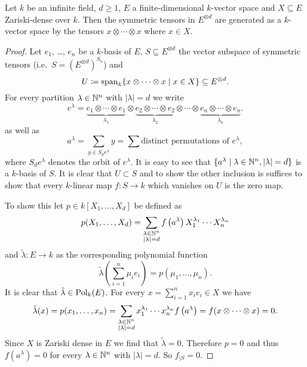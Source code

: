 \begin{lem}\label{lem: symmetric tensors and zariski dense subsets}
  Let $k$ be an infinite field, $d \geq 1$, $E$ a finite-dimensional $k$-vector space and $X \subseteq E$ Zariski-dense over $k$. Then the symmetric tensors in $E^{\otimes d}$ are generated as a $k$-vector space by the tensors $x \otimes \dotsb \otimes x$ where $x \in X$.
\end{lem}
\begin{proof}
  Let $e_1$, \dots, $e_n$ be a $k$-basis of $E$, $S \subseteq E^{\otimes d}$ the vector subspace of symmetric tensors (i.e.\ $S = (E^{\otimes d})^{S_n}$) and
  \[
    U \coloneqq \operatorname{span}_k \{x \otimes \dotsb \otimes x \mid x \in X\} \subseteq E^{\otimes d}.
  \]
  For every partition $\lambda \in \mathbb{N}^n$ with $|\lambda| = d$ we write
  \[
    e^\lambda = \underbrace{e_1 \otimes \dotsb \otimes e_1}_{\lambda_1} \otimes \underbrace{e_2 \otimes \dotsb \otimes e_2}_{\lambda_2} \otimes \dotsb \otimes \underbrace{e_n \otimes \dotsb \otimes e_n}_{\lambda_n}.
  \]
  as well as
  \[
    a^\lambda = \sum_{y \in S_d e^\lambda} y = \sum \text{distinct permutations of $e^\lambda$},
  \]
  where $S_d e^\lambda$ denotes the orbit of $e^\lambda$. It is easy to see that $\{a^\lambda \mid \lambda \in \mathbb{N}^n, |\lambda|=d\}$ is a $k$-basis of $S$. It is clear that $U \subset S$ and to show the other inclusion is suffices to show that every $k$-linear map $f \colon S \to k$ which vanishes on $U$ is the zero map.
  
  To show this let $p \in k[X_1, \dotsc, X_d]$ be defined as
  \[
    p(X_1, \dotsc, X_d) = \sum_{\substack{\lambda \in \mathbb{N}^n \\ |\lambda| = d}} f\left( a^\lambda \right) X_1^{\lambda_1} \dotsm X_n^{\lambda_n}
  \]
  and $\tilde{\lambda} \colon E \to k$ as the corresponding polynomial function
  \[
    \tilde{\lambda}\left( \sum_{i=1}^n \mu_i e_i \right) = p(\mu_1, \dotsc, \mu_n).
  \]
  It is clear that $\tilde{\lambda} \in \operatorname{Pol}_k(E)$. For every $x = \sum_{i=1}^n x_i e_i \in X$ we have
  \[
    \tilde{\lambda}(x)
    = p(x_1, \dotsc, x_n)
    = \sum_{\substack{\lambda \in \mathbb{N}^n \\ |\lambda| = d}} x_1^{\lambda_1} \dotsm x_n^{\lambda_n} f\left( a^\lambda \right) 
    = f(x \otimes \dotsb \otimes x)
    = 0.
  \]
  Since $X$ is Zariski dense in $E$ we find that $\tilde{\lambda} = 0$. Therefore $p = 0$ and thus $f(a^\lambda) = 0$ for every $\lambda \in \mathbb{N}^n$ with $|\lambda| = d$. So $f_{|S} = 0$.
\end{proof}


